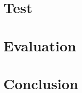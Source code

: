 \documentclass[11pt,oneside]{report}
\begin{document}
	\chapter{Test}\label{chap:test}
	\chapter{Evaluation}\label{chap:eval}
	\chapter{Conclusion}\label{chap:concl}

	
	
\end{document}
